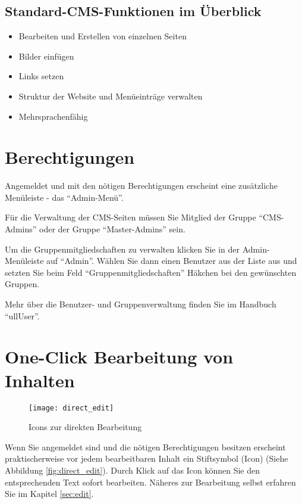 \documentclass[article, a4paper, oneside, 11pt]{memoir}
\begin{document}
\section{Standard-CMS-Funktionen im Überblick}

\begin{itemize}
\item Bearbeiten und Erstellen von einzelnen Seiten
\item Bilder einfügen
\item Links setzen
\item Struktur der Website und Menüeinträge verwalten
\item Mehrsprachenfähig
\end{itemize}




\chapter{Berechtigungen}

Angemeldet und mit den nötigen Berechtigungen erscheint eine zusätzliche Menüleiste - das "`Admin-Menü"'. 

Für die Verwaltung der CMS-Seiten müssen Sie Mitglied der Gruppe "`CMS-Admins"' oder der Gruppe "`Master-Admins"' sein.

Um die Gruppenmitgliedschaften zu verwalten klicken Sie in der Admin-Menüleiste auf "`Admin"'. Wählen Sie dann einen Benutzer aus der Liste aus und setzten Sie beim Feld "`Gruppenmitgliedschaften"' Häkchen bei den gewünschten Gruppen.

Mehr über die Benutzer- und Gruppenverwaltung finden Sie im Handbuch "`ullUser"'.


\chapter{One-Click Bearbeitung von Inhalten}

\begin{figure}[htp]
\centering
\texttt{[image: direct\_edit]}
\caption{Icons zur direkten Bearbeitung}
\label{fig:direct_edit}
\end{figure}

Wenn Sie angemeldet sind und die nötigen Berechtigungen besitzen erscheint praktischerweise vor jedem bearbeitbaren Inhalt ein Stiftsymbol (Icon) (Siehe Abbildung \vref{fig:direct_edit}). Durch Klick auf das Icon können Sie den entsprechenden Text sofort bearbeiten.
Näheres zur Bearbeitung selbst erfahren Sie im Kapitel \vref{sec:edit}.
\end{document}
